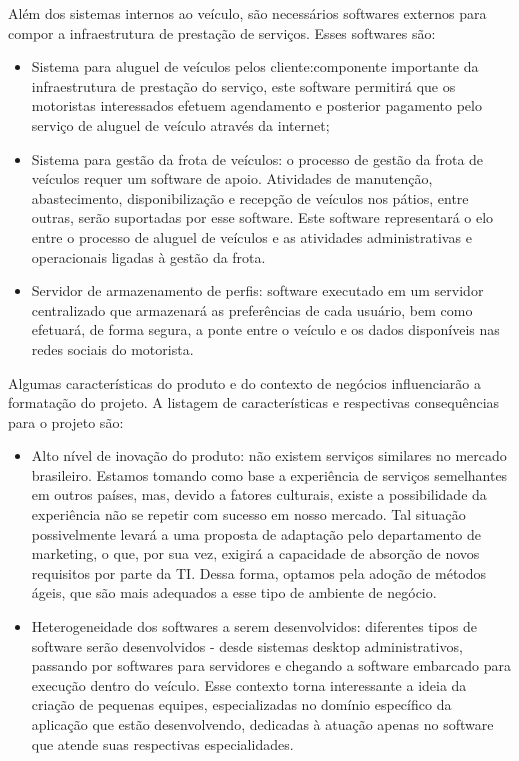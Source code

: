 \documentclass[12pt,journal,compsoc]{IEEEtran}
\begin{document}
Além dos sistemas internos ao veículo, são necessários softwares externos para compor a infraestrutura de prestação de serviços. Esses softwares são:

\begin{itemize}

\item Sistema para aluguel de veículos pelos cliente:componente importante da infraestrutura de prestação do serviço, este software permitirá que os motoristas interessados efetuem agendamento e posterior pagamento pelo serviço de aluguel de veículo através da internet;

\item Sistema para gestão da frota de veículos: o processo de gestão da frota de veículos requer um software de apoio. Atividades de manutenção, abastecimento, disponibilização e recepção de veículos nos pátios, entre outras, serão suportadas por esse software. Este software representará o elo entre o processo de aluguel de veículos e as atividades administrativas e operacionais ligadas à gestão da frota.

\item Servidor de armazenamento de perfis: software executado em um servidor centralizado que armazenará as preferências de cada usuário, bem como efetuará, de forma segura, a ponte entre o veículo e os dados disponíveis nas redes sociais do motorista.

\end{itemize}

Algumas características do produto e do contexto de negócios influenciarão a formatação do projeto. A listagem de características e respectivas consequências para o projeto são:

\begin{itemize}

\item Alto nível de inovação do produto: não existem serviços similares no mercado brasileiro. Estamos tomando como base a experiência de serviços semelhantes em outros países, mas, devido a fatores culturais, existe a possibilidade da experiência não se repetir com sucesso em nosso mercado. Tal situação possivelmente levará a uma proposta de adaptação pelo departamento de marketing, o que, por sua vez, exigirá a capacidade de absorção de novos requisitos por parte da TI. Dessa forma, optamos pela adoção de métodos ágeis, que são mais adequados a esse tipo de ambiente de negócio.

\item Heterogeneidade dos softwares a serem desenvolvidos: diferentes tipos de software serão desenvolvidos - desde sistemas desktop administrativos, passando por softwares para servidores e chegando a software embarcado para execução dentro do veículo. Esse contexto torna interessante a ideia da criação de pequenas equipes, especializadas no domínio específico da aplicação que estão desenvolvendo, dedicadas à atuação apenas no software que atende suas respectivas especialidades.

\end{itemize}
\end{document}
